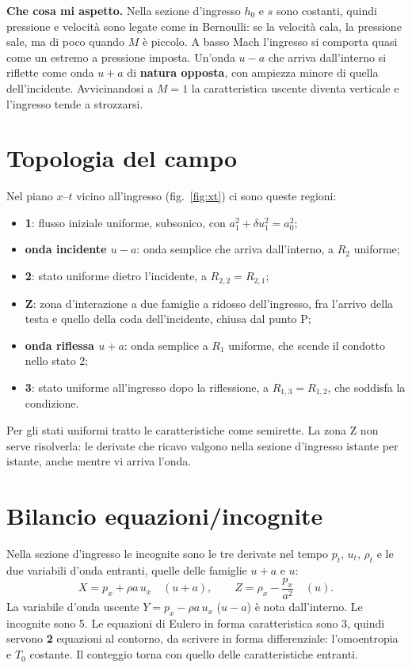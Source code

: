 \documentclass[11pt,a4paper]{article}
\newcommand{\Ru}{R_1}
\newcommand{\Rd}{R_2}
\newcommand{\uma}{u-a}
\newcommand{\upa}{u+a}
\begin{document}
\textbf{Che cosa mi aspetto.} Nella sezione d'ingresso $h_0$ e $s$ sono costanti, quindi pressione e velocità sono
legate come in Bernoulli: se la velocità cala, la pressione sale, ma di poco quando $M$ è piccolo. A basso Mach
l'ingresso si comporta quasi come un estremo a pressione imposta. Un'onda $\uma$ che arriva dall'interno si riflette
come onda $\upa$ di \textbf{natura opposta}, con ampiezza minore di quella dell'incidente. Avvicinandosi a $M=1$ la
caratteristica uscente diventa verticale e l'ingresso tende a strozzarsi.

\section{Topologia del campo}
Nel piano $x$--$t$ vicino all'ingresso (fig.~\ref{fig:xt}) ci sono queste regioni:
\begin{itemize}
  \item \textbf{1}: flusso iniziale uniforme, subsonico, con $a_1^2+\delta u_1^2=a_0^2$;
  \item \textbf{onda incidente $\uma$}: onda semplice che arriva dall'interno, a $\Rd$ uniforme;
  \item \textbf{2}: stato uniforme dietro l'incidente, a $R_{2,2}=R_{2,1}$;
  \item \textbf{Z}: zona d'interazione a due famiglie a ridosso dell'ingresso, fra l'arrivo della testa e quello
        della coda dell'incidente, chiusa dal punto P;
  \item \textbf{onda riflessa $\upa$}: onda semplice a $\Ru$ uniforme, che scende il condotto nello stato 2;
  \item \textbf{3}: stato uniforme all'ingresso dopo la riflessione, a $R_{1,3}=R_{1,2}$, che soddisfa la condizione.
\end{itemize}
Per gli stati uniformi tratto le caratteristiche come semirette. La zona Z non serve risolverla: le derivate che
ricavo valgono nella sezione d'ingresso istante per istante, anche mentre vi arriva l'onda.

\section{Bilancio equazioni/incognite}
Nella sezione d'ingresso le incognite sono le tre derivate nel tempo $p_t$, $u_t$, $\rho_t$ e le due variabili
d'onda entranti, quelle delle famiglie $\upa$ e $u$:
\[
  X=p_x+\rho a\,u_x \quad(\upa),\qquad Z=\rho_x-\frac{p_x}{a^2}\quad(u).
\]
La variabile d'onda uscente $Y=p_x-\rho a\,u_x$ ($\uma$) è nota dall'interno. Le incognite sono 5. Le equazioni di
Eulero in forma caratteristica sono 3, quindi servono \textbf{2} equazioni al contorno, da scrivere in forma
differenziale: l'omoentropia e $T_0$ costante. Il conteggio torna con quello delle caratteristiche entranti.
\end{document}
